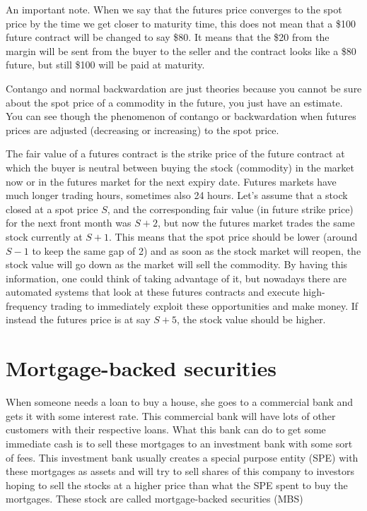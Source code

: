 An important note. When we say that the futures price converges to the spot price by the time we get closer to maturity time, this does not mean that a \$100 future contract will be changed to say \$80. It means that the \$20 from the margin will be sent from the buyer to the seller and the contract looks like a \$80 future, but still \$100 will be paid at maturity.

Contango and normal backwardation are just theories because you cannot be sure about the spot price of a commodity in the future, you just have an estimate. You can see though the phenomenon of contango or backwardation when futures prices are adjusted (decreasing or increasing) to the spot price.

The fair value of a futures contract is the strike price of the future contract at which the buyer is neutral between buying the stock (commodity) in the market now or in the futures market for the next expiry date. Futures markets have much longer trading hours, sometimes also 24 hours. Let's assume that a stock closed at a spot price $S$, and the corresponding fair value (in future strike price) for the next front month was $S + 2$, but now the futures market trades the same stock currently at $S+1$. This means that the spot price should be lower (around $S - 1$ to keep the same gap of 2) and as soon as the stock market will reopen, the stock value will go down as the market will sell the commodity. By having this information, one could think of taking advantage of it, but nowadays there are automated systems that look at these futures contracts and execute high-frequency trading to immediately exploit these opportunities and make money. If instead the futures price is at say $S+5$, the stock value should be higher.

\section{Mortgage-backed securities}
When someone needs a loan to buy a house, she goes to a commercial bank and gets it with some interest rate. This commercial bank will have lots of other customers with their respective loans. What this bank can do to get some immediate cash is to sell these mortgages to an investment bank with some sort of fees. This investment bank usually creates a special purpose entity (SPE) with these mortgages as assets and will try to sell shares of this company to investors hoping to sell the stocks at a higher price than what the SPE spent to buy the mortgages. These stock are called mortgage-backed securities (MBS)


